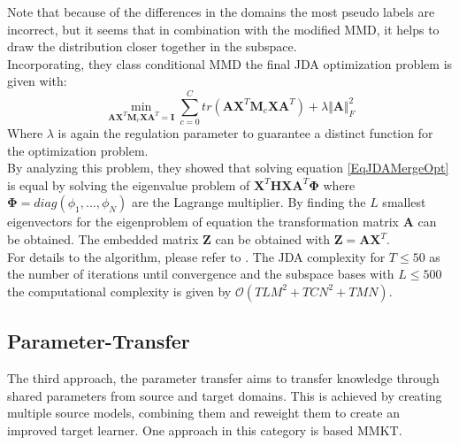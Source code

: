 Note that because of the differences in the domains the most pseudo labels are incorrect, but it seems that in combination with the modified \acs{MMD}, it helps to draw the distribution closer together in the subspace.\cite{Long.}\\
Incorporating, they class conditional \acs{MMD} the final \acs{JDA} optimization problem is given with:\cite{Long.}
\begin{equation}\label{EqJDAMergeOpt}
\min_{\mathbf{A}\mathbf{X}^T\mathbf{M}_c\mathbf{X}\mathbf{A}^T=\mathbf{I}} \sum_{c=0}^{C} tr(\mathbf{A}\mathbf{X}^T\mathbf{M}_c\mathbf{X}\mathbf{A}^T) + \lambda \Vert\mathbf{A}\Vert^2_F
\end{equation}
Where $\lambda$ is again the regulation parameter to guarantee a distinct function for the optimization problem.\\
By analyzing this problem, they showed that solving equation \eqref{EqJDAMergeOpt} is equal by solving the eigenvalue problem of $\mathbf{X}^T\mathbf{HX}\mathbf{A}^T\boldsymbol{\Phi}$ where $\boldsymbol{\Phi} = diag(\phi_1,\dots,\phi_N)$ are the Lagrange multiplier. By finding the $L$ smallest eigenvectors for the eigenproblem of equation the transformation matrix $\mathbf{A}$ can be obtained. The embedded matrix $\mathbf{Z}$ can be obtained with $\mathbf{Z} = \mathbf{A}\mathbf{X}^T$.\cite{Long.}\\
For details to the algorithm, please refer to \cite{Long.}.
The \acs{JDA} complexity for $T\le 50$ as the number of iterations until convergence and the subspace bases with $L\le 500$ the computational complexity is given by $\mathcal{O}(TLM^2+TCN^2+TMN)$.\cite{Long.}
\subsection{Parameter-Transfer}\label{TlSubSecPara}
The third approach, the parameter transfer aims to transfer knowledge through shared parameters from source and target domains.
This is achieved by creating multiple source models, combining them and reweight them to create an improved target learner.
One approach in this category is based \ac{MMKT}.\cite[p. 7-8]{Weiss.2016}
